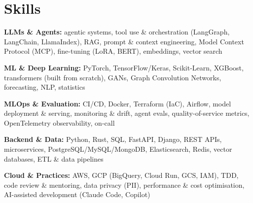 \documentclass[10pt,a4paper]{article}
\begin{document}
\section{Skills}
\begin{tight}
  \item[\textcolor{accent}{\small$\bullet$}] \textbf{LLMs \& Agents:} agentic systems, tool use \& orchestration (LangGraph, LangChain, LlamaIndex), RAG, prompt \& context engineering, Model Context Protocol (MCP), fine-tuning (LoRA, BERT), embeddings, vector search
  \item[\textcolor{accent}{\small$\bullet$}] \textbf{ML \& Deep Learning:} PyTorch, TensorFlow/Keras, Scikit-Learn, XGBoost, transformers (built from scratch), GANs, Graph Convolution Networks, forecasting, NLP, statistics
  \item[\textcolor{accent}{\small$\bullet$}] \textbf{MLOps \& Evaluation:} CI/CD, Docker, Terraform (IaC), Airflow, model deployment \& serving, monitoring \& drift, agent evals, quality-of-service metrics, OpenTelemetry observability, on-call
  \item[\textcolor{accent}{\small$\bullet$}] \textbf{Backend \& Data:} Python, Rust, SQL, FastAPI, Django, REST APIs, microservices, PostgreSQL/MySQL/MongoDB, Elasticsearch, Redis, vector databases, ETL \& data pipelines
  \item[\textcolor{accent}{\small$\bullet$}] \textbf{Cloud \& Practices:} AWS, GCP (BigQuery, Cloud Run, GCS, IAM), TDD, code review \& mentoring, data privacy (PII), performance \& cost optimisation, AI-assisted development (Claude Code, Copilot)
\end{tight}

\end{document}
